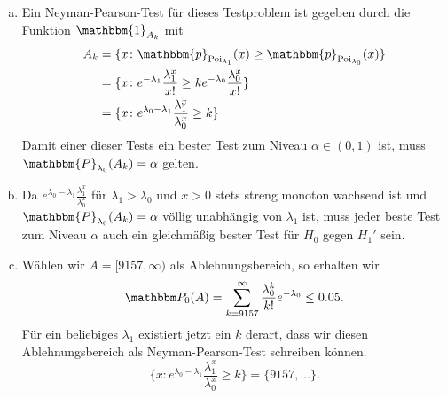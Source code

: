 \documentclass[uebung]{lecture}
\begin{document}
\begin{aufgabe}
    \begin{enumerate}[(a)]
        \item Ein Neyman-Pearson-Test für dieses Testproblem ist gegeben durch die Funktion $\mathbbm{1}_{A_k}$ mit 
        \begin{align*}
            A_k &= \{x \colon \mathbbm{p}_{\mathrm{Poi}_{\lambda_1}} (x) \geq \mathbbm{p}_{\mathrm{Poi}_{\lambda_0}} (x)\}\\
            &= \{x \colon e^{-\lambda_1} \frac{\lambda_1^x}{x!} \geq k e^{-\lambda_0} \frac{\lambda_0^x}{x!}\}\\
            &= \{x \colon e^{\lambda_0 -\lambda_1} \frac{\lambda_1^x}{\lambda_0^x} \geq k\}
        \end{align*}
        Damit einer dieser Tests ein bester Test zum Niveau $\alpha \in (0,1)$ ist, muss $\mathbbm{P}_{\lambda_0}(A_k) = \alpha$ gelten.
        \item Da $e^{\lambda_0 -\lambda_1} \frac{\lambda_1^x}{\lambda_0^x}$ für $\lambda_1 > \lambda_0$ und $x > 0$ 
        stets streng monoton wachsend ist und $\mathbbm{P}_{\lambda_0}(A_k) = \alpha$ völlig unabhängig von $\lambda_1$ ist, 
        muss jeder beste Test zum Niveau $\alpha$ auch ein gleichmäßig bester Test für $H_0$ gegen $H_1'$ sein.
        \item Wählen wir $A = [9157, \infty)$ als Ablehnungsbereich, so erhalten wir 
        \[
            \mathbbm P_0 (A) = \sum_{k = 9157}^{\infty} \frac{\lambda_0^k}{k!} e^{-\lambda_0} \leq 0.05.
        \]
        Für ein beliebiges $\lambda_1$ existiert jetzt ein $k$ derart, dass wir diesen Ablehnungsbereich als Neyman-Pearson-Test schreiben können.
        \[
            \{x \colon e^{\lambda_0 -\lambda_1} \frac{\lambda_1^x}{\lambda_0^x} \geq k\} = \{9157,\dots\}.
        \]
    \end{enumerate}
\end{aufgabe}
\end{document}
